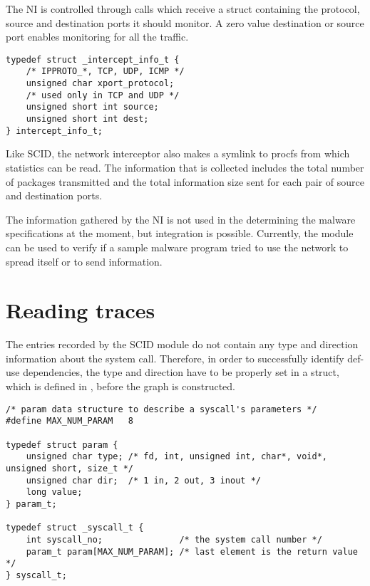 The NI is controlled through  calls which receive a  struct containing the protocol, source and destination ports it should monitor. A zero value destination or source port enables monitoring for all the traffic.

\lstset{language=C,caption=parameter data structures,label=lst:param-struct}
\begin{lstlisting}
typedef struct _intercept_info_t {
	/* IPPROTO_*, TCP, UDP, ICMP */
	unsigned char xport_protocol;
	/* used only in TCP and UDP */
	unsigned short int source;
	unsigned short int dest;
} intercept_info_t;
\end{lstlisting}

Like SCID, the network interceptor also makes a symlink to procfs from which statistics can be read. The information that is collected includes the total number of packages transmitted and the total information size sent for each pair of source and destination ports.

The information gathered by the NI is not used in the determining the malware specifications at the moment, but integration is possible. Currently, the module can be used to verify if a sample malware program tried to use the network to spread itself or to send information.

\section{Reading traces}
\label{fourth:read-traces}

The entries recorded by the SCID module do not contain any type and direction information about the system call. Therefore, in order to successfully identify def-use dependencies, the type and direction have to be properly set in a  struct, which is defined in , before the graph is constructed.

\lstset{language=C,caption=Parameter data structures,label=lst:param-struct}
\begin{lstlisting}
/* param data structure to describe a syscall's parameters */
#define MAX_NUM_PARAM	8

typedef struct param {
	unsigned char type; /* fd, int, unsigned int, char*, void*, unsigned short, size_t */
	unsigned char dir;  /* 1 in, 2 out, 3 inout */
	long value;
} param_t;

typedef struct _syscall_t {
	int syscall_no;               /* the system call number */
	param_t param[MAX_NUM_PARAM]; /* last element is the return value */
} syscall_t;
\end{lstlisting}

